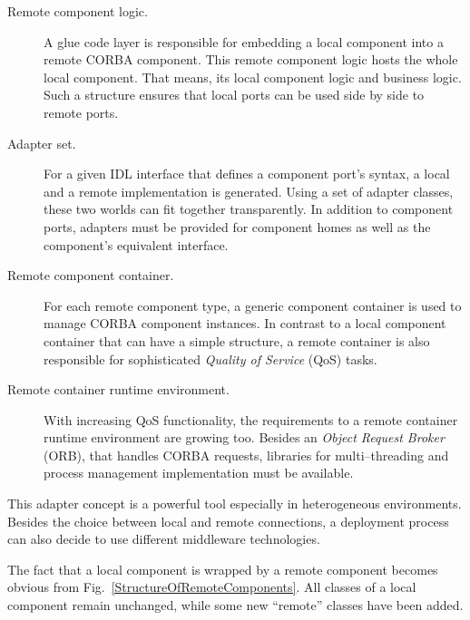 \begin{description}
\item [Remote component logic.]
A glue code layer is responsible for embedding a local component into a 
remote CORBA component. 
This remote component logic hosts the whole local component.
That means, its local component logic and business logic.  
Such a structure ensures that local ports can be used side by side to remote
ports.

\item [Adapter set.]
For a given IDL interface that defines a component port's syntax, a local and 
a remote implementation is generated. 
Using a set of adapter classes, these two worlds can fit together transparently.
In addition to component ports, adapters must be provided for component homes
as well as the component's equivalent interface.

\item [Remote component container.]
For each remote component type, a generic component container is used to
manage CORBA component instances.
In contrast to a local component container that can have a simple structure, a
remote container is also responsible for sophisticated {\it Quality of Service} 
(QoS) tasks.

\item [Remote container runtime environment.]
With increasing QoS functionality, the requirements to a remote container
runtime environment are growing too.
Besides an {\it Object Request Broker} (ORB), that handles CORBA requests,
libraries for multi--threading and process management implementation must 
be available.  
\end{description}

\noindent
This adapter concept is a powerful tool especially in heterogeneous 
environments. Besides the choice between local and remote connections, 
a deployment process can also decide to use different middleware technologies.


The fact that a local component is wrapped by a remote component becomes 
obvious from Fig.~\ref{StructureOfRemoteComponents}. All classes of a local
component remain unchanged, while some new ``remote'' classes have been added.

